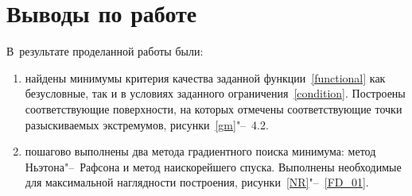 \newpage


\section{Выводы по работе}
В~результате проделанной работы были:
\begin{enumerate}
	\item найдены минимумы критерия качества заданной функции~\eqref{functional} как безусловные, так и в условиях заданного ограничения~\eqref{condition}. Построены соответствующие поверхности, на которых отмечены соответствующие точки разыскиваемых экстремумов, рисунки~\ref{gm}"--~4.2.
	\item пошагово выполнены два метода градиентного поиска минимума: метод Ньэтона"--~Рафсона и метод наискорейшего спуска. Выполнены необходимые для максимальной наглядности построения, рисунки~\ref{NR}"--~\ref{FD_01}.
\end{enumerate}